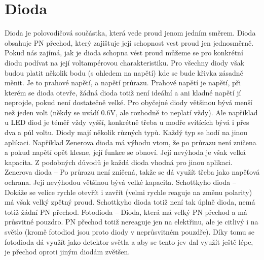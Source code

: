 \documentclass{template/socthesis}
\begin{document}
	\section*{Dioda}
	Dioda je polovodičová součástka, která vede proud jenom jedním směrem. Dioda obsahuje PN přechod, který zajištuje její schopnost vest proud jen jednosměrně. Pokud nás zajímá, jak je dioda schopna vést proud můžeme se pro konkrétní diodu podívat na její voltampérovou charakteristiku. Pro všechny diody však budou platit několik bodu (s ohledem na napětí) kde se bude křivka zásadně měnit. Je to prahové napětí, a napětí průrazu. Prahové napětí je napětí, při kterém se dioda otevře, žádná dioda totiž není ideální a ani kladné napětí jí neprojde, pokud není dostatečně velké. Pro obyčejné diody většinou bývá menší než jeden volt (někdy se uvádí 0.6V, ale rozhodně to neplatí vždy). Ale například u LED diod je téměř vždy vyšší, konkrétně třeba u modře svítících bývá i přes dva a půl voltu.
	Diody mají několik různých typů. Každý typ se hodí na jinou aplikaci. Například Zenerova dioda má výhodu vtom, že po průrazu není zničena a pokud napětí opět klesne, její funkce se obnoví. Její nevýhoda je však velká kapacita. Z podobných důvodů je každá dioda vhodná pro jinou aplikaci.
	Zenerova dioda – Po průrazu není zničená, takže se dá využít třeba jako napěťová ochrana. Její nevýhodou většinou bývá velké kapacita.
	Schottkyho dioda – Dokáže se velice rychle otevřít i zavřít (velmi rychle reaguje na změnu polarity) má však velký zpětný proud. Schottkyho dioda totiž není tak úplně dioda, nemá totiž žádní PN přechod.
	Fotodioda – Dioda, která má velký PN přechod a má průsvitné pouzdro. PN přechod totiž nereaguje jen na elektřinu, ale je citlivý i na světlo (kromě fotodiod jsou proto diody v neprůsvitném pouzdře). Díky tomu se fotodioda dá využít jako detektor světla a aby se tento jev dal využít ještě lépe, 
	je přechod oproti jiným diodám zvětšen.
\end{document}
